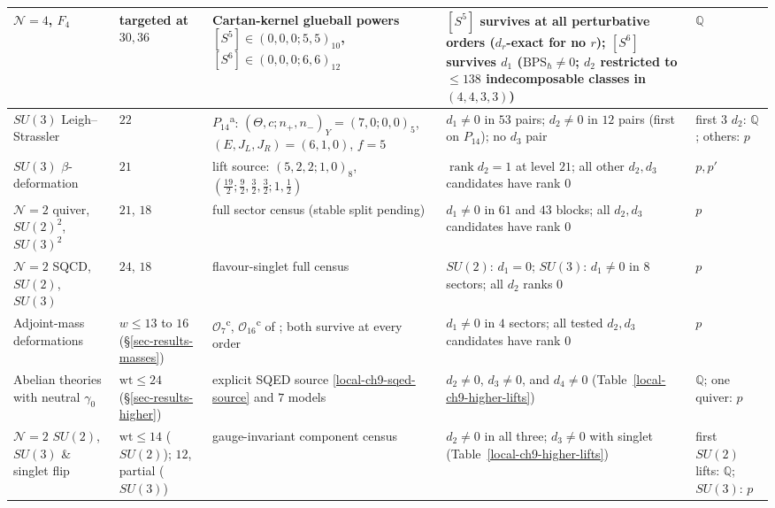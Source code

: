 \documentclass[11pt]{article}
\numberwithin{equation}{section}
\numberwithin{figure}{section}
\numberwithin{table}{section}
\begin{document}
{\begin{xltabular}{\linewidth}{|>{\raggedright\arraybackslash}p{2.35cm}|>{\raggedright\arraybackslash}p{2.15cm}|>{\raggedright\arraybackslash}X|>{\raggedright\arraybackslash}X|>{\raggedright\arraybackslash}p{1.75cm}|}
\hline
$\mathcal N=4$, $F_4$ & targeted at $30,36$ & Cartan-kernel glueball powers $[S^5]\in(0,0,0;5,5)_{10}$, $[S^6]\in(0,0,0;6,6)_{12}$ & $[S^5]$ survives at all perturbative orders ($d_r$-exact for no $r$); $[S^6]$ survives $d_1$ ($\mathrm{BPS}_{\hbar}\ne0$; $d_2$ restricted to $\le138$ indecomposable classes in $(4,4,3,3)$) & $\mathbb Q$\\
\hline
$SU(3)$ Leigh--Strassler & $22$ & $P_{14}$\textsuperscript{a}: $(\Theta,c;n_+,n_-)_Y=(7,0;0,0)_5$, $(E,J_L,J_R)=(6,1,0)$, $f=5$ & $d_1\ne0$ in $53$ pairs; $d_2\ne0$ in $12$ pairs (first on $P_{14}$); no $d_3$ pair & first $3$ $d_2$: $\mathbb Q$; others: $p$\\
\hline
$SU(3)$ $\beta$-deformation & $21$ & lift source: $(5,2,2;1,0)_8$, $(\tfrac{19}2;\tfrac92,\tfrac32,\tfrac32;1,\tfrac12)$ & $\operatorname{rank}d_2=1$ at level $21$; all other $d_2,d_3$ candidates have rank $0$ & $p,p'$\\
\hline
$\mathcal N=2$ quiver, $SU(2)^2$, $SU(3)^2$ & $21$, $18$ & full sector census (stable split pending) & $d_1\ne0$ in $61$ and $43$ blocks; all $d_2,d_3$ candidates have rank $0$ & $p$\\
\hline
$\mathcal N=2$ SQCD, $SU(2)$, $SU(3)$ & $24$, $18$ & flavour-singlet full census & $SU(2)$: $d_1=0$; $SU(3)$: $d_1\ne0$ in $8$ sectors; all $d_2$ ranks $0$ & $p$\\
\hline
Adjoint-mass deformations & $w\le 13$ to $16$ (\S\ref{sec-results-masses}) & $\mathcal O_7$\textsuperscript{c}, $\mathcal O_{16}$\textsuperscript{c} of \cite{CK}; both survive at every order & $d_1\ne0$ in $4$ sectors; all tested $d_2,d_3$ candidates have rank $0$ & $p$\\
\hline
Abelian theories with neutral $\gamma_0$ & $\mathrm{wt}\le 24$ (\S\ref{sec-results-higher}) & explicit SQED source \eqref{local-ch9-sqed-source} and $7$ models & $d_2\ne0$, $d_3\ne0$, and $d_4\ne0$ (Table~\ref{local-ch9-higher-lifts}) & $\mathbb Q$; one quiver: $p$\\
\hline
$\mathcal N=2$ $SU(2)$, $SU(3)$ \& singlet flip & $\mathrm{wt}\le 14$ ($SU(2)$); $12$, partial ($SU(3)$) & gauge-invariant component census & $d_2\ne0$ in all three; $d_3\ne0$ with singlet (Table~\ref{local-ch9-higher-lifts}) & first $SU(2)$ lifts: $\mathbb Q$; $SU(3)$: $p$\\
\hline
\end{xltabular}}
\end{document}
